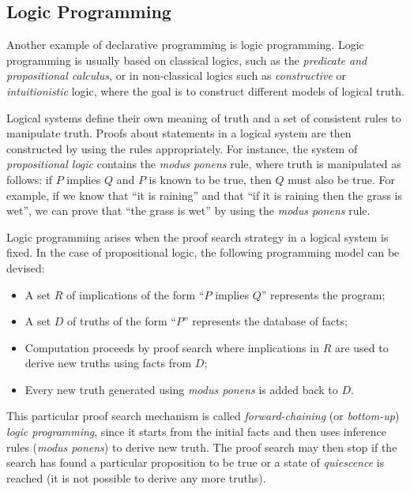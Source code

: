 \subsection{Logic Programming}

Another example of declarative programming is logic programming.
Logic programming is usually based on classical logics, such as the
\emph{predicate and propositional calculus}, or in non-classical logics such as
\emph{constructive} or \emph{intuitionistic} logic, where the goal is to
construct different models of logical truth.

Logical systems define their own meaning of truth and a set of consistent rules
to manipulate truth. Proofs about statements in a logical system are then
constructed by using the rules appropriately. For instance, the system of
\emph{propositional logic} contains the \emph{modus ponens} rule, where truth is
manipulated as follows: if $P$ implies $Q$ and $P$ is known to be true,
then $Q$ must also be true. For example, if we know that ``it is raining'' and that ``if
it is raining then the grass is wet'', we can prove that ``the grass is wet'' by
using the \emph{modus ponens} rule.

Logic programming arises when the proof search strategy in a logical system is
fixed. In the case of propositional logic, the following programming model can
be devised:

\begin{itemize}
   \item A set $R$ of implications of the form ``$P$ implies $Q$'' represents the
      program;
   \item A set $D$ of truths of the form ``$P$'' represents the database of
      facts;
   \item Computation proceeds by proof search where implications in $R$ are used
      to derive new truths using facts from $D$;
   \item Every new truth generated using \emph{modus ponens} is added back to
      $D$.
\end{itemize}

This particular proof search mechanism is called \emph{forward-chaining} (or
\emph{bottom-up}) \emph{logic programming}, since it starts from the initial
facts and then uses inference rules (\emph{modus ponens}) to derive new truth.
The proof search may then stop if the search has found a particular proposition
to be true or a state of \emph{quiescence} is reached (it is not possible to
derive any more truths).

